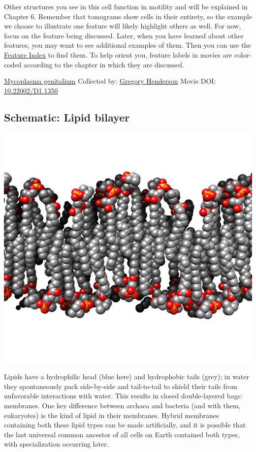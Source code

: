 \documentclass[]{tufte-book}
\begin{document}
Other structures you see in this cell function in motility and will be explained in Chapter 6. Remember that tomograms show cells in their entirety, so the example we choose to illustrate one feature will likely highlight others as well. For now, focus on the feature being discussed. Later, when you have learned about other features, you may want to see additional examples of them. Then you can use the \protect\hyperlink{feature-index}{Feature Index} to find them. To help orient you, feature labels in movies are color-coded according to the chapter in which they are discussed.



\hypertarget{htmlwidget-161de44c09664157a426}{}

\label{fig:2-1}\protect\hyperlink{tree}{Mycoplasma genitalium} Collected by: \protect\hyperlink{gregory_henderson}{Gregory Henderson} Movie DOI: \href{https://doi.org/10.22002/D1.1350}{10.22002/D1.1350}

\hypertarget{Lipid_bilayer}{%
\subsection*{Schematic: Lipid bilayer}\label{Lipid_bilayer}}

\includegraphics{img/schematics/2_1_1}

Lipids have a hydrophilic head (blue here) and hydrophobic tails (grey); in water they spontaneously pack side-by-side and tail-to-tail to shield their tails from unfavorable interactions with water. This results in closed double-layered bags: membranes. One key difference between archaea and bacteria (and with them, eukaryotes) is the kind of lipid in their membranes. Hybrid membranes containing both these lipid types can be made artificially, and it is possible that the last universal common ancestor of all cells on Earth contained both types, with specialization occurring later.
\end{document}
